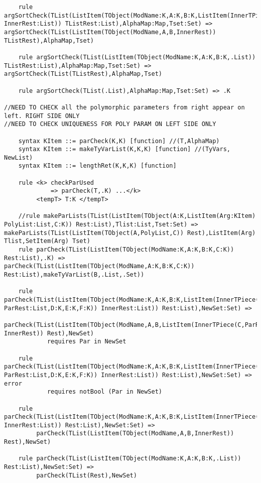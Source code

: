\begin{lstlisting}
    rule argSortCheck(TList(ListItem(TObject(ModName:K,A:K,B:K,ListItem(InnerTPiece(C:K,D:K,.List,E:K,F:K)) InnerRest:List)) TListRest:List),AlphaMap:Map,Tset:Set) => argSortCheck(TList(ListItem(TObject(ModName,A,B,InnerRest)) TListRest),AlphaMap,Tset)

    rule argSortCheck(TList(ListItem(TObject(ModName:K,A:K,B:K,.List)) TListRest:List),AlphaMap:Map,Tset:Set) => argSortCheck(TList(TListRest),AlphaMap,Tset)

    rule argSortCheck(TList(.List),AlphaMap:Map,Tset:Set) => .K

//NEED TO CHECK all the polymorphic parameters from right appear on left. RIGHT SIDE ONLY
//NEED TO CHECK UNIQUENESS FOR POLY PARAM ON LEFT SIDE ONLY

    syntax KItem ::= parCheck(K,K) [function] //(T,AlphaMap)
    syntax KItem ::= makeTyVarList(K,K,K) [function] //(TyVars, NewList)
    syntax KItem ::= lengthRet(K,K,K) [function]

    rule <k> checkParUsed
             => parCheck(T,.K) ...</k>
         <tempT> T:K </tempT>

    //rule makeParLists(TList(ListItem(TObject(A:K,ListItem(Arg:KItem) PolyList:List,C:K)) Rest:List),Tlist:List,Tset:Set) => makeParLists(TList(ListItem(TObject(A,PolyList,C)) Rest),ListItem(Arg) Tlist,SetItem(Arg) Tset)
    rule parCheck(TList(ListItem(TObject(ModName:K,A:K,B:K,C:K)) Rest:List),.K) => parCheck(TList(ListItem(TObject(ModName,A:K,B:K,C:K)) Rest:List),makeTyVarList(B,.List,.Set))

    rule parCheck(TList(ListItem(TObject(ModName:K,A:K,B:K,ListItem(InnerTPiece(C:K,ListItem(Par:KItem) ParRest:List,D:K,E:K,F:K)) InnerRest:List)) Rest:List),NewSet:Set) =>
         parCheck(TList(ListItem(TObject(ModName,A,B,ListItem(InnerTPiece(C,ParRest,D,E,F)) InnerRest)) Rest),NewSet)
            requires Par in NewSet

    rule parCheck(TList(ListItem(TObject(ModName:K,A:K,B:K,ListItem(InnerTPiece(C:K,ListItem(Par:KItem) ParRest:List,D:K,E:K,F:K)) InnerRest:List)) Rest:List),NewSet:Set) => error
            requires notBool (Par in NewSet)

    rule parCheck(TList(ListItem(TObject(ModName:K,A:K,B:K,ListItem(InnerTPiece(C:K,.List,D:K,E:K,F:K)) InnerRest:List)) Rest:List),NewSet:Set) =>
         parCheck(TList(ListItem(TObject(ModName,A,B,InnerRest)) Rest),NewSet)

    rule parCheck(TList(ListItem(TObject(ModName:K,A:K,B:K,.List)) Rest:List),NewSet:Set) =>
         parCheck(TList(Rest),NewSet)


\end{lstlisting}
